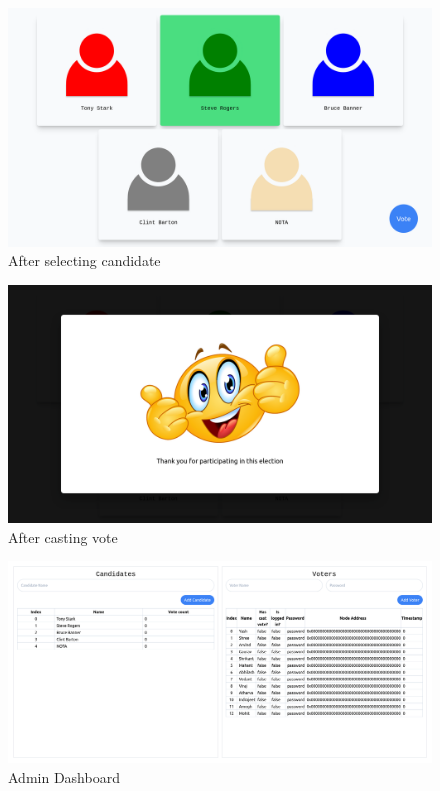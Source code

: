\documentclass[oneside, 12pt]{book}
\begin{document}
		\begin{figure}[H]
			\includegraphics[width=\linewidth]{./Resources/post-vote.png}
		    \caption{After selecting candidate}
		    \label{fig:post-vote}
		\end{figure}
		\begin{figure}[H]
			\includegraphics[width=\linewidth]{./Resources/thankyou.png}
		    \caption{After casting vote}
		    \label{fig:thankyou}
		\end{figure}
		\begin{figure}[H]
			\includegraphics[width=\linewidth]{./Resources/admin.png}
		    \caption{Admin Dashboard}
		    \label{fig:admin}
		\end{figure}
	\newpage
\end{document}
